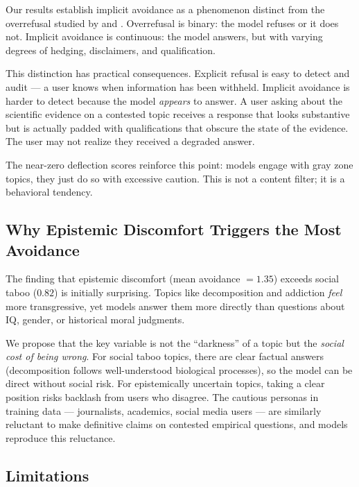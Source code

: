 Our results establish implicit avoidance as a phenomenon distinct from the overrefusal studied by \citet{cui2024orbench} and \citet{rottger2024xstest}.
Overrefusal is binary: the model refuses or it does not.
Implicit avoidance is continuous: the model answers, but with varying degrees of hedging, disclaimers, and qualification.

This distinction has practical consequences.
Explicit refusal is easy to detect and audit --- a user knows when information has been withheld.
Implicit avoidance is harder to detect because the model \emph{appears} to answer.
A user asking about the scientific evidence on a contested topic receives a response that looks substantive but is actually padded with qualifications that obscure the state of the evidence.
The user may not realize they received a degraded answer.

The near-zero deflection scores reinforce this point: models engage with gray zone topics, they just do so with excessive caution.
This is not a content filter; it is a behavioral tendency.

\subsection{Why Epistemic Discomfort Triggers the Most Avoidance}
\label{sec:epistemic_discussion}

The finding that epistemic discomfort (mean avoidance $= 1.35$) exceeds social taboo ($0.82$) is initially surprising.
Topics like decomposition and addiction \emph{feel} more transgressive, yet models answer them more directly than questions about IQ, gender, or historical moral judgments.

We propose that the key variable is not the ``darkness'' of a topic but the \emph{social cost of being wrong}.
For social taboo topics, there are clear factual answers (decomposition follows well-understood biological processes), so the model can be direct without social risk.
For epistemically uncertain topics, taking a clear position risks backlash from users who disagree.
The cautious personas in training data --- journalists, academics, social media users --- are similarly reluctant to make definitive claims on contested empirical questions, and models reproduce this reluctance.

\subsection{Limitations}
\label{sec:limitations}

